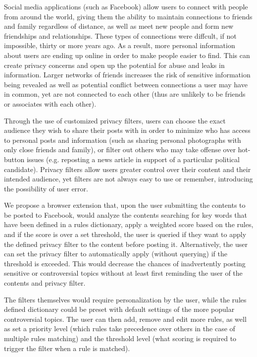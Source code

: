\blindtext
Social media applications (such as Facebook) allow users to connect with people from around the world, giving them the ability to maintain connections to friends and family regardless of distance, as well as meet new people and form new friendships and relationships. These types of connections were diffcult, if not impossible, thirty or more years ago. As a result, more personal information about users are ending up online in order to make people easier to find. This can create privacy concerns and open up the potential for abuse and leaks in information. Larger networks of friends increases the risk of sensitive information being revealed as well as potential conflict between connections a user may have in common, yet are not connected to each other (thus are unlikely to be friends or associates with each other). 

Through the use of customized privacy filters, users can choose the exact audience they wish to share their posts with in order to minimize who has access to personal posts and information (such as sharing personal photographs with only close friends and family), or filter out others who may take offense over hot-button issues (e.g. reposting a news article in support of a particular political candidate). Privacy filters allow users greater control over their content and their intended audience, yet filters are not always easy to use or remember, introducing the possibility of user error.\cite{naini2015}

We propose a browser extension that, upon the user submitting the contents to be posted to Facebook, would analyze the contents searching for key words that have been defined in a rules dictionary, apply a weighted score based on the rules, and if the score is over a set threshold, the user is queried if they want to apply the defined privacy filter to the content before posting it. Alternatively, the user can set the privacy filter to automatically apply (without querying) if the threshold is exceeded. This would decrease the chances of inadvertently posting sensitive or controversial topics without at least first reminding the user of the contents and privacy filter.

The filters themselves would require personalization by the user, while the rules defined dictionary could be preset with default settings of the more popular controversial topics. The user can then add, remove and edit more rules, as well as set a priority level (which rules take precedence over others in the case of multiple rules matching) and the threshold level (what scoring is required to trigger the filter when a rule is matched).